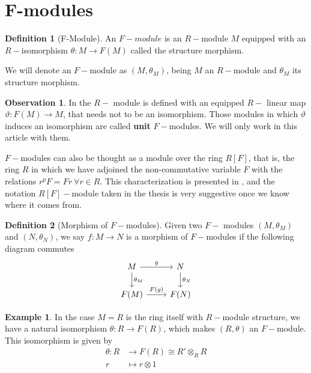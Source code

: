 \documentclass[leqno]{article}
\theoremstyle{definition}
\newtheorem{definition}{Definition}[section]
\newtheorem{observation}{Observation}[section]
\newtheorem{example}{Example}[section]
\begin{document}
\section{F-modules}

\begin{definition}[F-Module] An $F-module$ is an $R-$module $M$ equipped with an $R-$isomorphism  $\theta:M \to F(M)$ called the structure morphism.
\end{definition}

We will denote an $F-$module as  $(M, \theta_M)$, being $M$ an  $R-$module and  $\theta _M$ its structure morphism.

\begin{observation} In \cite{blickle} the $R-$ module is defined with an equipped $R-$ linear map $\vartheta : F(M)\to M$, that needs not to be an isomorphism. Those modules in which $\vartheta$ induces an isomorphism are called \textbf{unit} $F-$modules. We will only work in this article with them.
\end{observation}

$F-$modules can also be thought as a module over the ring  $R[F]$, that is, the ring  $R$ in which we have adjoined the non-commutative variable  $F$ with the relations  $r^pF = Fr \ \forall r\in R$. This characterization is presented in \cite{blickle}, and the notation $R[F]-$module taken in the thesis is very suggestive once we know where it comes from.



\begin{definition}[Morphism of $F-$modules] Given two  $F-$ modules  $(M, \theta _M)$ and $(N, \theta _N)$, we say $f:M\to N$ is a morphism of $F-$modules if the following diagram commutes
\[\begin{tikzcd}
	M & N \\
	{F(M)} & {F(N)}
	\arrow["{\theta_M}", from=1-1, to=2-1]
	\arrow["{\theta_N}", from=1-2, to=2-2]
	\arrow["g", from=1-1, to=1-2]
	\arrow["{F(g)}", from=2-1, to=2-2]
\end{tikzcd}\]
\end{definition}

\begin{example} In the case $M=R$ is the ring itself with  $R-$module structure, we have a natural isomorphism  $\theta : R \to F(R)$, which makes $(R, \theta )$ an $F-$module. This isomorphism is given by
  \begin{align*}
	\theta : R &\to F(R)\cong R' \otimes _R R \\
	r &\mapsto r \otimes 1
  \end{align*}

\end{example}
\end{document}
